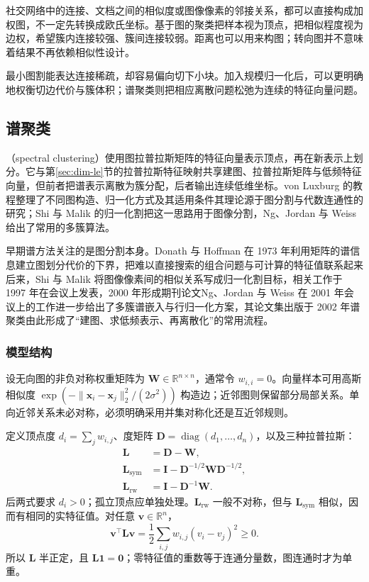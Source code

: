 社交网络中的连接、文档之间的相似度或图像像素的邻接关系，都可以直接构成加权图，不一定先转换成欧氏坐标。基于图的聚类把样本视为顶点，把相似程度视为边权，希望簇内连接较强、簇间连接较弱。距离也可以用来构图；转向图并不意味着结果不再依赖相似性设计。

最小图割能表达连接稀疏，却容易偏向切下小块。加入规模归一化后，可以更明确地权衡切边代价与簇体积；谱聚类则把相应离散问题松弛为连续的特征向量问题。

\subsection{谱聚类}
\label{sec:clustering-spectral}

（spectral clustering）使用图拉普拉斯矩阵的特征向量表示顶点，再在新表示上划分。它与第\ref{sec:dim-le}节的拉普拉斯特征映射共享建图、拉普拉斯矩阵与低频特征向量，但前者把谱表示离散为簇分配，后者输出连续低维坐标。von Luxburg 的教程整理了不同图构造、归一化方式及其适用条件其理论源于图分割与代数连通性的研究；Shi 与 Malik 的归一化割把这一思路用于图像分割，Ng、Jordan 与 Weiss 给出了常用的多簇算法。

早期谱方法关注的是图分割本身。Donath 与 Hoffman 在 1973 年利用矩阵的谱信息建立图划分代价的下界，把难以直接搜索的组合问题与可计算的特征值联系起来后来，Shi 与 Malik 将图像像素间的相似关系写成归一化割目标，相关工作于 1997 年在会议上发表，2000 年形成期刊论文Ng、Jordan 与 Weiss 在 2001 年会议上的工作进一步给出了多簇谱嵌入与行归一化方案，其论文集出版于 2002 年谱聚类由此形成了“建图、求低频表示、再离散化”的常用流程。

\subsubsection{模型结构}

设无向图的非负对称权重矩阵为 $\bm{W}\in\mathbb{R}^{n\times n}$，通常令 $w_{i,i}=0$。向量样本可用高斯相似度 $\exp(-\lVert\bm{x}_i-\bm{x}_j\rVert_2^2/(2\sigma^2))$ 构造边；近邻图则保留部分局部关系。单向近邻关系未必对称，必须明确采用并集对称化还是互近邻规则。

定义顶点度 $d_i=\sum_jw_{i,j}$、度矩阵 $\bm{D}=\operatorname{diag}(d_1,\ldots,d_n)$，以及三种拉普拉斯：
\begin{align}
 \bm{L}&=\bm{D}-\bm{W},\nonumber\\
 \bm{L}_{\mathrm{sym}}
 &=\bm{I}-\bm{D}^{-1/2}\bm{W}\bm{D}^{-1/2},\nonumber\\
 \bm{L}_{\mathrm{rw}}
 &=\bm{I}-\bm{D}^{-1}\bm{W}.
 \label{eq:clustering-laplacians}
\end{align}
后两式要求 $d_i>0$；孤立顶点应单独处理。$\bm{L}_{\mathrm{rw}}$ 一般不对称，但与 $\bm{L}_{\mathrm{sym}}$ 相似，因而有相同的实特征值。对任意 $\bm{v}\in\mathbb{R}^n$，
\begin{equation}
 \bm{v}^{\top}\bm{L}\bm{v}
 =\frac12\sum_{i,j}w_{i,j}(v_i-v_j)^2\geq0.
 \label{eq:clustering-laplacian-form}
\end{equation}
所以 $\bm{L}$ 半正定，且 $\bm{L}\bm{1}=\bm{0}$；零特征值的重数等于连通分量数，图连通时才为单重。

